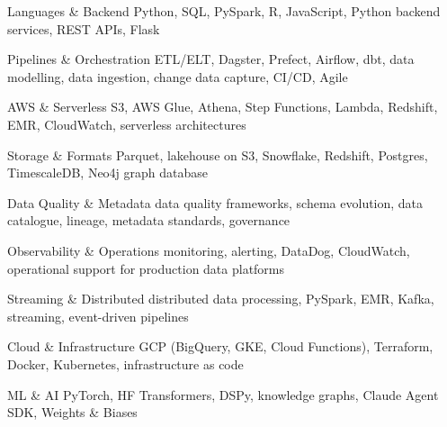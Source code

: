
\begin{cvskills}

  \cvskill
    {Languages \& Backend}
    {Python, SQL, PySpark, R, JavaScript, Python backend services, REST APIs, Flask}

  \cvskill
    {Pipelines \& Orchestration}
    {ETL/ELT, Dagster, Prefect, Airflow, dbt, data modelling, data ingestion, change data capture, CI/CD, Agile}

  \cvskill
    {AWS \& Serverless}
    {S3, AWS Glue, Athena, Step Functions, Lambda, Redshift, EMR, CloudWatch, serverless architectures}

  \cvskill
    {Storage \& Formats}
    {Parquet, lakehouse on S3, Snowflake, Redshift, Postgres, TimescaleDB, Neo4j graph database}

  \cvskill
    {Data Quality \& Metadata}
    {data quality frameworks, schema evolution, data catalogue, lineage, metadata standards, governance}

  \cvskill
    {Observability \& Operations}
    {monitoring, alerting, DataDog, CloudWatch, operational support for production data platforms}

  \cvskill
    {Streaming \& Distributed}
    {distributed data processing, PySpark, EMR, Kafka, streaming, event-driven pipelines}

  \cvskill
    {Cloud \& Infrastructure}
    {GCP (BigQuery, GKE, Cloud Functions), Terraform, Docker, Kubernetes, infrastructure as code}

  \cvskill
    {ML \& AI}
    {PyTorch, HF Transformers, DSPy, knowledge graphs, Claude Agent SDK, Weights \& Biases}

\end{cvskills}
